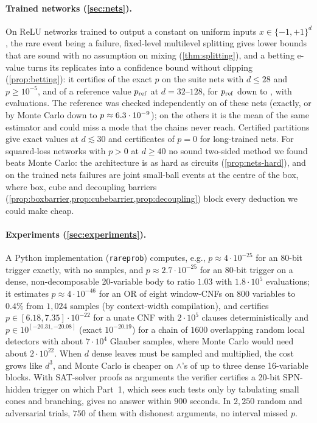 \paragraph{Trained networks (\cref{sec:nets}).} On ReLU networks trained to output a
constant on uniform inputs $x\in\{-1,+1\}^d$, the rare event being a failure,
fixed-level multilevel splitting gives lower bounds that are sound with no assumption on
mixing (\cref{thm:splitting}), and a betting e-value turns its replicates into a
confidence bound without clipping (\cref{prop:betting}): it certifies \nnSuiteRatioL{} of
the exact $p$ on the suite nets with $d\le28$ and $p\ge10^{-5}$, and \nnScaleRatio{} of a
reference value $p_{\rm ref}$ at $d=32$--$128$, for $p_{\rm ref}$ down to \nnBigPref, with
\nnScaleFpe{} evaluations. The reference was checked independently on
\nnScaleChecked{} of these \nnScaleNets{} nets (exactly, or by Monte Carlo down to
$p\approx6.3\cdot10^{-9}$); on the others it is the mean of the same estimator and could
miss a mode that the chains never reach. Certified partitions give exact values at $d\lesssim30$ and certificates of
$p=0$ for long-trained nets. For squared-loss networks with $p>0$ at $d\ge40$ no sound
two-sided method we found beats Monte Carlo: the architecture is as hard as circuits
(\cref{prop:nets-hard}), and on the trained nets failures are joint small-ball events at
the centre of the box, where box, cube and decoupling barriers
(\cref{prop:boxbarrier,prop:cubebarrier,prop:decoupling}) block every deduction we could
make cheap.

\paragraph{Experiments (\cref{sec:experiments}).} A Python implementation
(\texttt{rareprob}) computes, e.g., $p\approx4\cdot10^{-25}$ for an 80-bit trigger
exactly, with no samples, and $p\approx2.7\cdot10^{-25}$ for an 80-bit trigger on a
dense, non-decomposable 20-variable body to ratio $1.03$ with $1.8\cdot10^5$
evaluations; it estimates $p\approx4\cdot10^{-46}$ for an OR of eight window-CNFs on
$800$ variables to $0.4\%$ from $1{,}024$ samples (by context-width compilation), and
certifies $p\in[6.18,7.35]\cdot10^{-22}$ for a unate CNF with $2\cdot10^5$ clauses
deterministically and $p\in10^{[-20.31,-20.08]}$ (exact $10^{-20.19}$) for a chain of
$1600$ overlapping random local detectors with about $7\cdot10^4$ Glauber samples, where
Monte Carlo would need about $2\cdot10^{22}$. When $d$ dense leaves must be sampled and
multiplied, the cost grows like $d^3$, and Monte Carlo is cheaper on $\wedge$'s of up to
three dense 16-variable blocks. With SAT-solver proofs as arguments
the verifier certifies a 20-bit SPN-hidden trigger on which Part~1, which sees such
tests only by tabulating small cones and branching, gives no answer within $900$
seconds. In $2{,}250$ random and adversarial trials, $750$ of them with dishonest
arguments, no interval missed $p$.

